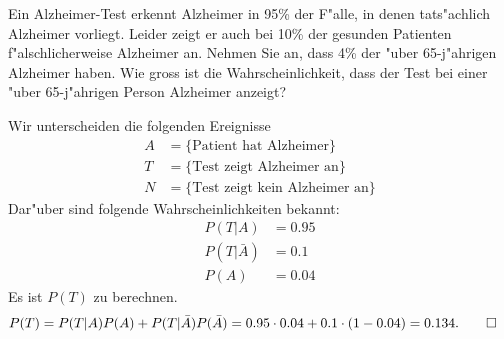 Ein Alzheimer-Test erkennt Alzheimer in 95\% der F"alle, in denen tats"achlich
Alzheimer vorliegt. Leider zeigt er auch bei 10\% der gesunden Patienten
f"alschlicherweise Alzheimer an. Nehmen Sie an, dass 4\% der "uber 65-j"ahrigen
Alzheimer haben.
Wie gross ist die Wahrscheinlichkeit, dass der Test bei einer "uber
65-j"ahrigen Person Alzheimer anzeigt?

\begin{loesung}
Wir unterscheiden die folgenden Ereignisse
\begin{align*}
A&=\{\text{Patient hat Alzheimer}\}
\\
T&=\{\text{Test zeigt Alzheimer an}\}
\\
N&=\{\text{Test zeigt kein Alzheimer an}\}
\end{align*}
Dar"uber sind folgende Wahrscheinlichkeiten bekannt:
\begin{align*}
P(T|A)&=0.95\\
P(T|\bar A)&=0.1\\
P(A)&=0.04
\end{align*}
Es ist $P(T)$ zu berechnen.
\begin{align*}
P(T)&=P(T|A)P(A)+P(T|\bar A)P(\bar A)=0.95\cdot 0.04 + 0.1\cdot (1-0.04)
=0.134.
\qedhere
\end{align*}
\end{loesung}

